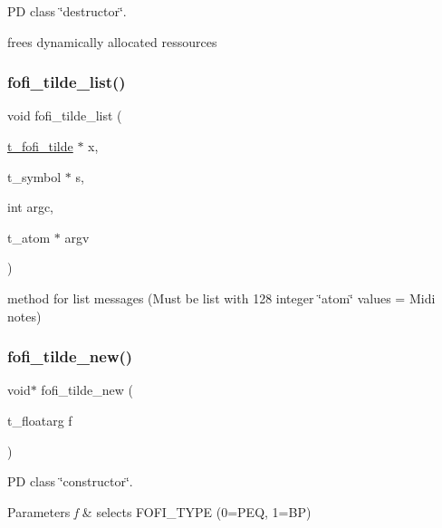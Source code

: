 PD class \char`\"{}destructor\char`\"{}. 

frees dynamically allocated ressources \mbox{\label{fofi~_8c_a83449b8d535886ef9d7ecd42146932c3}} 
\subsubsection{\texorpdfstring{fofi\_tilde\_list()}{fofi\_tilde\_list()}}
{\footnotesize\ttfamily void fofi\+\_\+tilde\+\_\+list (\begin{DoxyParamCaption}\item[{\mbox{\hyperlink{fofi~_8h_a9d4d0a864b5185ebc589d41112da08ce}{t\+\_\+fofi\+\_\+tilde}} $\ast$}]{x,  }\item[{t\+\_\+symbol $\ast$}]{s,  }\item[{int}]{argc,  }\item[{t\+\_\+atom $\ast$}]{argv }\end{DoxyParamCaption})}



method for list messages (Must be list with 128 integer \char`\"{}atom\char`\"{} values = Midi notes) 

\mbox{\label{fofi~_8c_a523787a74d7b8f02c80d1e0cc0468699}} 
\subsubsection{\texorpdfstring{fofi\_tilde\_new()}{fofi\_tilde\_new()}}
{\footnotesize\ttfamily void$\ast$ fofi\+\_\+tilde\+\_\+new (\begin{DoxyParamCaption}\item[{t\+\_\+floatarg}]{f }\end{DoxyParamCaption})}



PD class \char`\"{}constructor\char`\"{}. 


\begin{DoxyParams}{Parameters}
{\em f} & selects F\+O\+F\+I\+\_\+\+T\+Y\+PE (0=P\+EQ, 1=BP) \\
\hline
\end{DoxyParams}
\mbox{\label{fofi~_8c_addff81b941469be60d263c2df0493f50}} 
